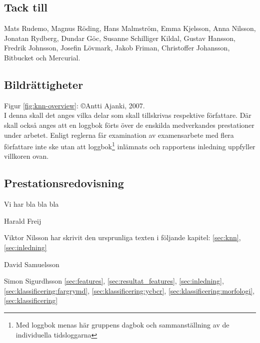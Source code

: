 \documentclass[../rapport_MVEX01-11-05]{subfiles}
\begin{document}
    \subsection*{Tack till}
    Mats Rudemo, Magnus Röding, Hans Malmström, Emma Kjelsson, Anna Nilsson,
    Jonatan Rydberg, Dundar Göc, Susanne Schilliger Kildal, Gustav Hansson,
    Fredrik Johnsson, Josefin Lövmark, Jakob Friman, Christoffer Johansson,
    Bitbucket och Mercurial.

    \subsection*{Bildrättigheter}
    Figur \ref{fig:knn-overview}: \copyright Antti Ajanki, 2007.\\

    
I denna skall det anges vilka delar som skall tillskrivas respektive
författare. Där skall också anges att en loggbok förts över de
enskilda medverkandes prestationer under arbetet.
Enligt reglerna får examination av examensarbete med flera författare
inte ske utan att loggbok\footnote{Med loggbok menas här gruppens
dagbok och sammanställning av de individuella tidsloggarna} inlämnats
och rapportens inledning uppfyller villkoren ovan.

\subsection*{Prestationsredovisning}
Vi har bla bla bla

Harald Freij

Viktor Nilsson har skrivit den ursprunliga texten i följande kapitel:
\ref{sec:knn}, \ref{sec:inledning}

David Samuelsson

Simon Sigurdhsson \ref{sec:features}, \ref{sec:resultat_features},
\ref{sec:inledning}, \ref{sec:klassificering:fargrymd},
\ref{sec:klassificering:ycbcr}, \ref{sec:klassificering:morfologi}, \ref{sec:klassificering}
\end{document}
